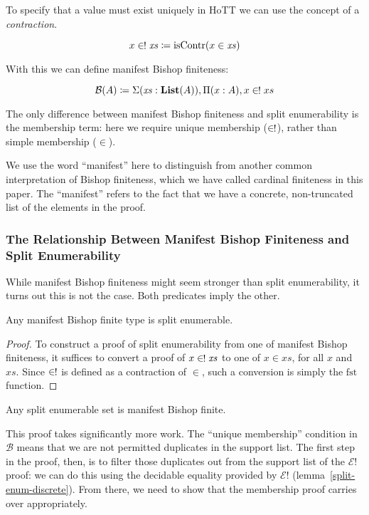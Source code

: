 To specify that a value must exist uniquely in HoTT we can use the concept of a
\emph{contraction}.
\begin{definition} \label{uniq-memb-def}
  \begin{equation}
    x \inunique \mathit{xs} \coloneqq \text{isContr}(x \in \mathit{xs})
  \end{equation}
\end{definition}
With this we can define manifest Bishop finiteness:
\begin{definition}  \label{bish-def}
  \begin{equation}
    \mathcal{B}(A) \coloneqq \Sigma {(\mathit{xs} : \textbf{List}(A))} , \Pi {(x : A)} , x \inunique xs
  \end{equation}
\end{definition}
The only difference between manifest Bishop finiteness and split enumerability
is the membership term: here we require unique membership (\(\inunique\)),
rather than simple membership (\(\in\)).

We use the word ``manifest'' here to distinguish from another common
interpretation of Bishop finiteness, which we have called cardinal finiteness in
this paper.
The ``manifest'' refers to the fact that we have a concrete, non-truncated list
of the elements in the proof.

\subsubsection{The Relationship Between Manifest Bishop Finiteness and Split
  Enumerability}
While manifest Bishop finiteness might seem stronger than split enumerability,
it turns out this is not the case.
Both predicates imply the other.
\begin{lemma} \label{manifest-bishop-to-split-enum}
  Any manifest Bishop finite type is split enumerable.
\end{lemma}
\begin{proof}
  To construct a proof of split enumerability from one of manifest Bishop
  finiteness, it suffices to convert a proof of \(x \inunique \mathit{xs}\) to
  one of \(x \in \mathit{xs}\), for all \(x\) and \(\mathit{xs}\).
  Since \(\inunique\) is defined as a contraction of \(\in\), such a conversion
  is simply the \(\text{fst}\) function.
\end{proof}

\begin{lemma} \label{split-enum-to-manifest-bishop}
  Any split enumerable set is manifest Bishop finite.
\end{lemma}
This proof takes significantly more work.
The ``unique membership'' condition in \(\mathcal{B}\) means that we are not
permitted duplicates in the support list.
The first step in the proof, then, is to filter those duplicates out from the
support list of the \(\mathcal{E}!\) proof: we can do this using the decidable
equality provided by \(\mathcal{E}!\) (lemma~\ref{split-enum-discrete}).
From there, we need to show that the membership proof carries over
appropriately.

